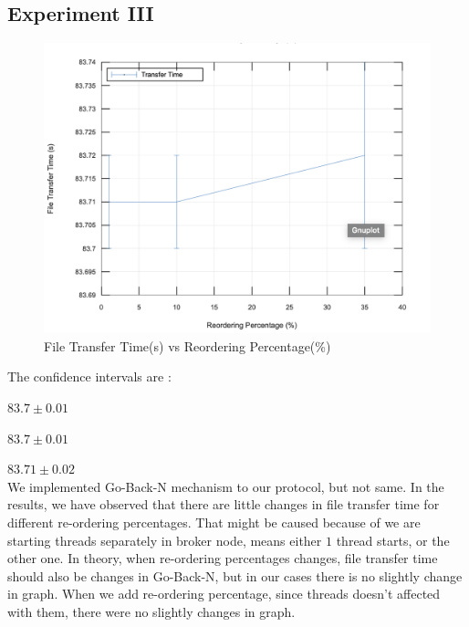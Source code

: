 \subsection{Experiment III}
\begin{figure}[ht]
   \centering
   \includegraphics[scale=.45]{images/exp3.png}
    \caption{File Transfer Time(s) vs Reordering Percentage(\%)}
    \label{fig:topology}
\end{figure}
The confidence intervals are :

$ 83.7 \pm 0.01$

$83.7 \pm 0.01$

$83.71 \pm 0.02$\\
We implemented Go-Back-N mechanism to our protocol, but not same. 
In the results, we have observed that there are little changes in file transfer time for different re-ordering percentages. That might be caused because of we are starting threads separately in broker node, means either $1$ thread starts, or the other one. In theory, when re-ordering percentages changes, file transfer time should also be changes in Go-Back-N, but in our cases there is no slightly change in graph. When we add re-ordering percentage, since threads doesn't affected with them, there were no slightly changes in graph.